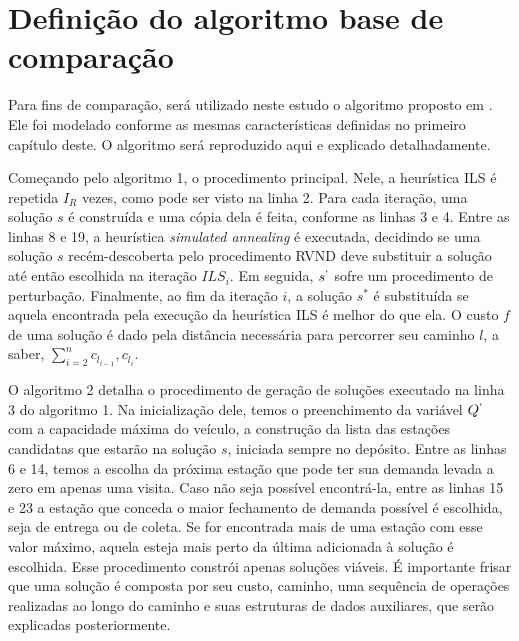 \chapter{Definição do algoritmo base de comparação}\label{chp:LABEL_CHP_3}

\par Para fins de comparação, será utilizado neste estudo o algoritmo proposto em \citet{art:REF_ART_1}. Ele foi modelado conforme as mesmas características definidas no primeiro capítulo deste. O algoritmo será reproduzido aqui e explicado detalhadamente.
\par Começando pelo algoritmo 1, o procedimento principal. Nele, a heurística ILS é repetida $I_R$ vezes, como pode ser visto na linha 2. Para cada iteração, uma solução $s$ é construída e uma cópia dela é feita, conforme as linhas 3 e 4. Entre as linhas 8 e 19, a heurística \textit{simulated annealing} é executada, decidindo se uma solução $s$ recém-descoberta pelo procedimento RVND deve substituir a solução até então escolhida na iteração $ILS_i$. Em seguida, $s^\lq$ sofre um procedimento de perturbação. Finalmente, ao fim da iteração $i$, a solução $s^*$ é substituída se aquela encontrada pela execução da heurística ILS é melhor do que ela. O custo $f$ de uma solução é dado pela distância necessária para percorrer seu caminho $l$, a saber, $\sum_{i=2}^{n}c_{l_{i-1}},c_{l_i}$.
\par O algoritmo 2 detalha o procedimento de geração de soluções executado na linha 3 do algoritmo 1. Na inicialização dele, temos o preenchimento da variável $Q^\lq$ com a capacidade máxima do veículo, a construção da lista das estações candidatas que estarão na solução $s$, iniciada sempre no depósito. Entre as linhas 6 e 14, temos a escolha da próxima estação que pode ter sua demanda levada a zero em apenas uma visita. Caso não seja possível encontrá-la, entre as linhas 15 e 23 a estação que conceda o maior fechamento de demanda possível é escolhida, seja de entrega ou de coleta. Se for encontrada mais de uma estação com esse valor máximo, aquela esteja mais perto da última adicionada à solução é escolhida. Esse procedimento constrói apenas soluções viáveis. É importante frisar que uma solução é composta por seu custo, caminho, uma sequência de operações realizadas ao longo do caminho e suas estruturas de dados auxiliares, que serão explicadas posteriormente.
